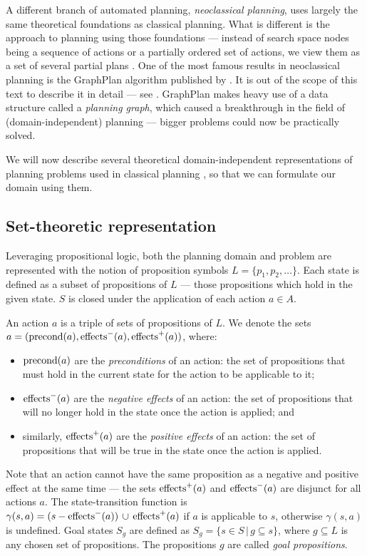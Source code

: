 A different branch of automated planning, \textit{neoclassical planning},
uses largely the same theoretical foundations as classical 
planning. What is different is the approach to planning using those foundations
--- instead of search space nodes being a sequence of actions or a partially ordered
set of actions, we view them as a set of several partial plans
\citep[Part~II]{Ghallab2004}.
One of the most famous results in neoclassical planning is the GraphPlan algorithm
published by \citet{Blum1997}. It is out of the scope of this text to describe it in detail
--- see \citet[Section~6.3]{Ghallab2004}.
GraphPlan makes heavy use of a data structure called a \textit{planning graph},
which caused a breakthrough in the field of (domain-independent) planning
--- bigger problems could now be practically solved.

We will now describe several theoretical domain-independent representations
of planning problems used in classical planning \citep[Chapter~2]{Ghallab2004},
so that we can formulate our domain using them.

\subsection{Set-theoretic representation}

Leveraging propositional logic, both the planning domain and problem
are represented with the notion
of proposition symbols $L = \{p_1, p_2, \ldots\}$.
Each state is defined as a subset of propositions of $L$ --- those propositions
which hold in the given state. $S$ is closed under the application of each
action $a \in A$.

An action $a$
is a triple of sets of propositions of $L$.
We denote the sets $a = (\operatorname{\textrm{precond}}(a), \operatorname{\textrm{effects}}^-(a), \operatorname{\textrm{effects}}^+(a))$, where:
\begin{itemize}
\item $\operatorname{\textrm{precond}}(a)$ are the \textit{preconditions} of an action: the set of
propositions that must hold in the current state for the action to be applicable to it;
\item $\operatorname{\textrm{effects}}^-(a)$ are the \textit{negative effects} of an action:
the set of propositions
that will no longer hold in the state once the action is applied; and
\item similarly, $\operatorname{\textrm{effects}}^+(a)$ are the \textit{positive effects} of an action:
the set of propositions that will be true in the state once the action is applied.
\end{itemize}
Note that an action cannot have the same proposition as a negative and positive effect at the same time --- the sets $\operatorname{\textrm{effects}}^+(a)$ and $\operatorname{\textrm{effects}}^-(a)$ are disjunct for all actions $a$.
The state-transition function is $\gamma(s, a) = (s - \operatorname{\textrm{effects}}^-(a)) \,\cup\,
\operatorname{\textrm{effects}}^+(a)$ if $a$ is applicable to $s$,
otherwise $\gamma(s, a)$ is undefined. Goal states $S_g$ are defined as
$S_g = \{s \in S \,|\, g \subseteq s\}$, where
$g \subseteq L$ is any chosen set of propositions. The propositions $g$ are called
\textit{goal propositions}.

